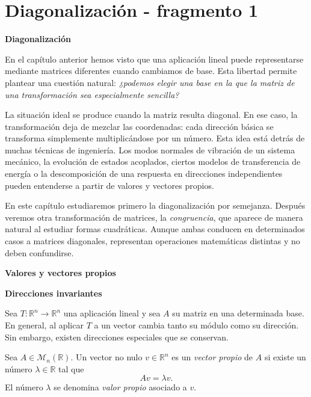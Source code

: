 
\section{Diagonalización - fragmento 1}
\textbf{Diagonalización}

En el capítulo anterior hemos visto que una aplicación lineal puede representarse mediante matrices diferentes cuando cambiamos de base. Esta libertad permite plantear una cuestión natural: \emph{¿podemos elegir una base en la que la matriz de una transformación sea especialmente sencilla?}

La situación ideal se produce cuando la matriz resulta diagonal. En ese caso, la transformación deja de mezclar las coordenadas: cada dirección básica se transforma simplemente multiplicándose por un número. Esta idea está detrás de muchas técnicas de ingeniería. Los modos normales de vibración de un sistema mecánico, la evolución de estados acoplados, ciertos modelos de transferencia de energía o la descomposición de una respuesta en direcciones independientes pueden entenderse a partir de valores y vectores propios.

En este capítulo estudiaremos primero la diagonalización por semejanza. Después veremos otra transformación de matrices, la \emph{congruencia}, que aparece de manera natural al estudiar formas cuadráticas. Aunque ambas conducen en determinados casos a matrices diagonales, representan operaciones matemáticas distintas y no deben confundirse.

\textbf{Valores y vectores propios}

\textbf{Direcciones invariantes}

Sea $T:\mathbb{R}^n\to\mathbb{R}^n$ una aplicación lineal y sea $A$ su matriz en una determinada base. En general, al aplicar $T$ a un vector cambia tanto su módulo como su dirección. Sin embargo, existen direcciones especiales que se conservan.

\begin{definition}
Sea $A\in\mathcal M_n(\mathbb{R})$. Un vector no nulo $v\in\mathbb{R}^n$ es un \emph{vector propio} de $A$ si existe un número $\lambda\in\mathbb{R}$ tal que
\[
Av=\lambda v.
\]
El número $\lambda$ se denomina \emph{valor propio} asociado a $v$.
\end{definition}


